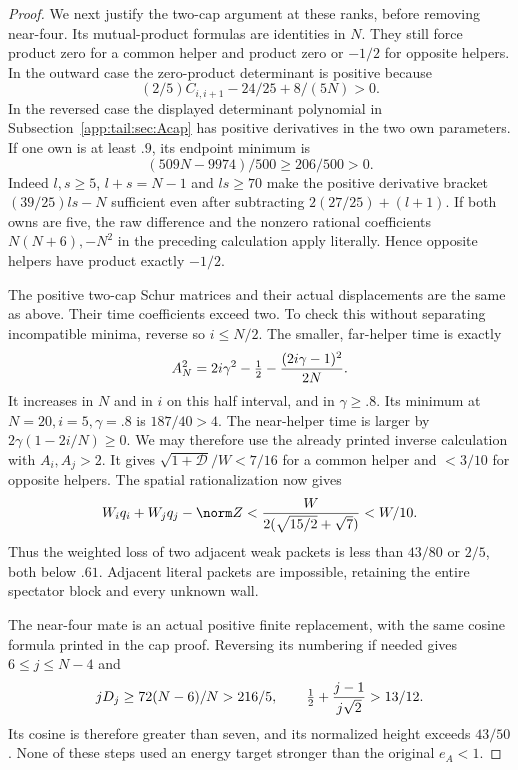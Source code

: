 \begin{proof}
We next justify the two-cap argument at these ranks, before removing
near-four. Its mutual-product formulas are identities in $N$.
They still force product zero for a common helper and product zero
or $-1/2$ for opposite helpers. In the outward case the zero-product
determinant is positive because
\[
 (2/5)C_{i,i+1}-24/25+8/(5N)>0.
\]
In the reversed case the displayed determinant polynomial in
Subsection~\ref{app:tail:sec:Acap} has positive derivatives in the
two own parameters. If one own is at least $.9$, its endpoint
minimum is
\[
 (509N-9974)/500\ge206/500>0.
\]
Indeed $l,s\ge5$, $l+s=N-1$ and $ls\ge70$ make the positive
derivative bracket $(39/25)ls-N$ sufficient even after subtracting
$2(27/25)+(l+1)$. If both owns are five, the raw difference
and the nonzero rational coefficients $N(N+6),-N^2$ in the
preceding calculation apply literally. Hence opposite helpers have
product exactly $-1/2$.

The positive two-cap Schur matrices and their actual displacements
are the same as above. Their time coefficients exceed two. To check
this without separating incompatible minima, reverse so $i\le N/2$.
The smaller, far-helper time is exactly
\[
 A_N^2=2i\gamma^2-\tfrac12-
                     {(2i\gamma-1)^2\over2N}.
\]
It increases in $N$ and in $i$ on this half interval, and in
$\gamma\ge.8$. Its minimum at $N=20,i=5,\gamma=.8$ is
$187/40>4$. The near-helper time is larger by
$2\gamma(1-2i/N)\ge0$. We may therefore use the already
printed inverse calculation with $A_i,A_j>2$.
It gives $\sqrt{1+\mathcal D}/W<7/16$ for a common helper
and $<3/10$ for opposite helpers. The spatial rationalization
now gives
\[
 W_iq_i+W_jq_j-\norm Z
 <{W\over2(\sqrt{15/2}+\sqrt7)}<W/10.
\]
Thus the weighted loss of two adjacent weak packets is less than
$43/80$ or $2/5$, both below $.61$. Adjacent literal packets
are impossible, retaining the entire spectator block and every
unknown wall.

The near-four mate is an actual positive finite replacement, with
the same cosine formula printed in the cap proof. Reversing its
numbering if needed gives $6\le j\le N-4$ and
\[
 jD_j\ge72(N-6)/N>216/5,\qquad
 \tfrac12+{j-1\over j\sqrt2}>13/12.
\]
Its cosine is therefore greater than seven, and its normalized
height exceeds $43/50$. None of these steps used an energy target
stronger than the original $e_A<1$.
\end{proof}


